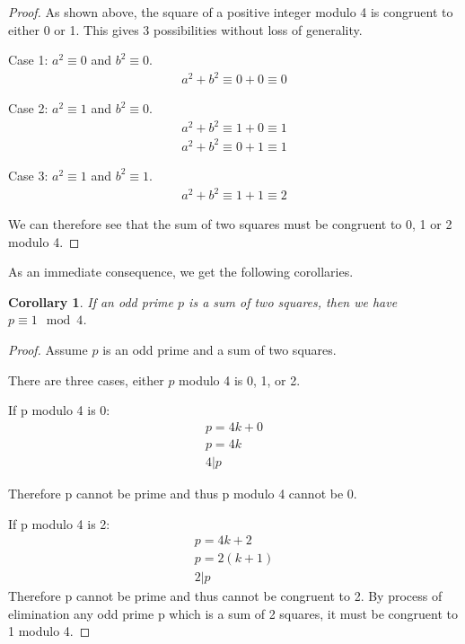 \documentclass[12pt]{article}
\newtheorem{cor}[thm]{Corollary}
\begin{document}
\begin{proof}
    As shown above, the square of a positive integer modulo 4 is
    congruent to either 0 or 1. This gives 3 possibilities without
    loss of generality.

    Case 1: $a^2 \equiv 0$ and $b^2 \equiv 0$.
    \begin{gather}
        a^2 + b^2 \equiv 0 + 0 \equiv 0
    \end{gather}

    Case 2: $a^2 \equiv 1$ and $b^2 \equiv 0$.
    \begin{gather}
        a^2 + b^2 \equiv 1 + 0 \equiv 1\\
        a^2 + b^2 \equiv 0 + 1 \equiv 1
    \end{gather}

    Case 3: $a^2 \equiv 1$ and $b^2 \equiv 1$.
    \begin{gather}
        a^2 + b^2 \equiv 1 + 1 \equiv 2
    \end{gather}

    
    We can therefore see that the sum of two squares must be
    congruent to 0, 1 or 2 modulo 4.
\end{proof}

As an immediate consequence, we get the following corollaries. 

\pagebreak
\begin{cor}  If an odd prime $p$ is a sum of two squares, then we have $p\equiv 1\mod 4$. 
\end{cor}
\begin{proof}
    Assume $p$ is an odd prime and a sum of two squares.

    There are three cases, either $p$ modulo 4 is 0, 1, or 2.

    If p modulo 4 is 0:
    \begin{gather}
        p = 4k + 0\\
        p = 4k\\
        4 | p
    \end{gather}

    Therefore p cannot be prime and thus p modulo 4 cannot
    be 0.

    If p modulo 4 is 2:
    \begin{gather}
        p = 4k + 2\\
        p = 2(k + 1)\\
        2 | p
    \end{gather}
    Therefore p cannot be prime and thus cannot be congruent
    to 2.
    By process of elimination any odd prime p which is a sum
    of 2 squares, it must be congruent to 1 modulo 4.
\end{proof}
\end{document}
